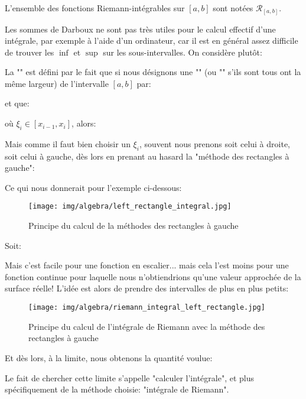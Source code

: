 	L'ensemble des fonctions Riemann-intégrables sur $[a, b]$ sont notées $\mathcal{R}_{[a,b]}$.
	
	Les sommes de Darboux ne sont pas très utiles pour le calcul effectif d'une intégrale, par exemple à l'aide d'un ordinateur, car il est en général assez difficile de trouver les $\inf$ et $\sup$ sur les sous-intervalles. On considère plutôt:
	
	La "" est défini par le fait que si nous désignons une "" (ou "" s'ils sont tous ont la même largeur) de l'intervalle $[a,b]$ par:
	
	et que:
	
	où $\xi_i \in [x_{i-1},x_i]$, alors:
	
	Mais comme il faut bien choisir un $\xi_i$, souvent nous prenons soit celui à droite, soit celui à gauche, dès lors en prenant au hasard la "méthode des rectangles à gauche":
	
	Ce qui nous donnerait pour l'exemple ci-dessous:
	\begin{figure}[H]
		\centering
		\texttt{[image: img/algebra/left\_rectangle\_integral.jpg]}
		\caption{Principe du calcul de la méthodes des rectangles à gauche}
	\end{figure}
	Soit:
	
	Mais c'est facile pour une fonction en escalier... mais cela l'est moins pour une fonction continue pour laquelle nous n'obtiendrions qu'une valeur approchée de la surface réelle! L'idée est alors de prendre des intervalles de plus en plus petits:
	\begin{figure}[H]
		\centering
		\texttt{[image: img/algebra/riemann\_integral\_left\_rectangle.jpg]}
		\caption{Principe du calcul de l'intégrale de Riemann avec la méthode des rectangles à gauche}
	\end{figure}
	Et dès lors, à la limite, nous obtenons la quantité voulue:
	
	Le fait de chercher cette limite s'appelle "calculer l'intégrale", et plus spécifiquement de la méthode choisie: "intégrale de Riemann".
	
